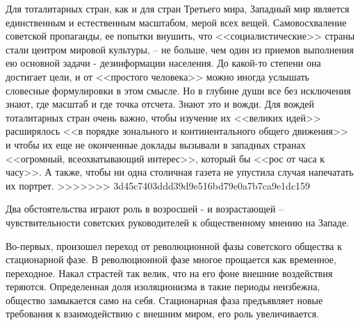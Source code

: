 \documentclass{book}
\begin{document}
{Для тоталитарных стран, как и для стран Третьего мира, Западный мир является единственным и естественным масшта­бом, мерой всех вещей. Самовосхваление советской пропаган­ды, ее попытки внушить, что <<социалистические>> страны ста­ли центром мировой культуры, -- не больше, чем один из при­емов выполнения ею основной задачи - дезинформации насе­ления. До какой-то степени она достигает цели, и от <<простого человека>> можно иногда услышать словесные формулировки в этом смысле. Но в глубине души все без исключения знают, где масштаб и где точка отсчета. Знают это и вожди. Для вож­дей тоталитарных стран очень важно, чтобы изучение их <<вели­ких идей>> расширялось <<в порядке зонального и континенталь­ного общего движения>> и чтобы их еще не оконченные докла­ды вызывали в западных странах <<огромный, всеохватываю­щий интерес>>, который бы <<рос от часа к часу>>. А также, чтобы ни одна столичная газета не упустила случая напечатать их порт­рет.
>>>>>>> 3d45c7403ddd39d9e516bd79e0a7b7ca9e1dc159

Два обстоятельства играют роль в возросшей - и возрас­тающей -- чувствительности советских руководителей к общест­венному мнению на Западе.

Во-первых, произошел переход от революционной фазы советского общества к стационарной фазе. В революционной фазе многое прощается как временное, переходное. Накал страстей так велик, что на его фоне внешние воздействия теря­ются. Определенная доля изоляционизма в такие периоды неизбежна, общество замыкается само на себя. Стационарная фаза предъявляет новые требования к взаимодействию с внеш­ним миром, его роль увеличивается.

}
\end{document}
